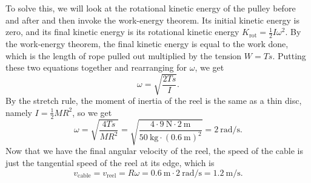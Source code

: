 \documentclass[../classical_mechanics.tex]{subfiles}
\begin{document}
\begin{example}
                To solve this, we will look at the rotational kinetic energy of the pulley before and after and then invoke the work-energy theorem.
                Its initial kinetic energy is zero, and its final kinetic energy is its rotational kinetic energy $K_\text{rot}=\frac{1}{2}I\omega^2$.
                By the work-energy theorem, the final kinetic energy is equal to the work done, which is the length of rope pulled out multiplied by the tension $W=Ts$.
                Putting these two equations together and rearranging for $\omega$, we get
                \begin{equation}
                    \omega=\sqrt{\frac{2Ts}{I}}.
                \end{equation}
                By the stretch rule, the moment of inertia of the reel is the same as a thin disc, namely $I=\frac{1}{2}MR^2$, so we get
                \begin{equation}
                    \omega=\sqrt{\frac{4Ts}{MR^2}}=\sqrt{\frac{4\cdot\qty{9}{\newton}\cdot\qty{2}{\meter}}{\qty{50}{\kilogram}\cdot(\qty{0.6}{\meter})^2}}=\qty{2}{\radian\per\second}.
                \end{equation}
                Now that we have the final angular velocity of the reel, the speed of the cable is just the tangential speed of the reel at its edge, which is
                \begin{equation}
                    v_\text{cable}=v_\text{reel}=R\omega=\qty{0.6}{\meter}\cdot\qty{2}{\radian\per\second}=\qty{1.2}{\meter\per\second}.
                \end{equation}
            \end{example}
\end{document}
